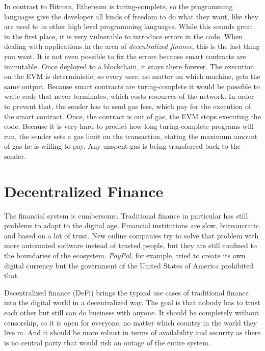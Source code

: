 In contrast to Bitcoin, Ethereum is turing-complete, so the programming languages
give the developer all kinds of freedom to do what they want, like they are used to in other high level programming languages. While this sounds great in the first
place, it is very vulnerable to introduce errors in the code. When dealing with applications in the area of \textit{decentralized finance}, this is the last thing you want.
It is not even possible to fix the errors because smart contracts are immutable. Once deployed to a blockchain, it stays there forever. The execution on the EVM
is deterministic, so every user, no matter on which machine, gets the same output. Because smart contracts are turing-complete it would be possible to write code
that never terminates, which costs resources of the network. In order to prevent that, the sender has to send gas fees, which pay for the execution of the smart
contract. Once, the contract is out of gas, the EVM stops executing the code. Because it is very hard to predict how long turing-complete programs will run, the sender
sets a gas limit on the transaction, stating the maximum amount of gas he is willing to pay. Any unspent gas is being transferred back to the sender.

\section{Decentralized Finance}
The financial system is cumbersome. Traditional finance in particular has still problems to adapt to the digital age. Financial institutions are slow, bureaucratic
and based on a lot of trust. New online companies try to solve that problem with more automated software instead of trusted people, but they are still confined
to the boundaries of the ecosystem. \textit{PayPal}, for example, tried to create its own digital currency but the government of the United States of America prohibited that.

Decentralized finance (DeFi) brings the typical use cases of traditional finance into the digital world in a decentralized way. The goal is that nobody has to trust each
other but still can do business with anyone. It should be completely without censorship, so it is open for everyone, no matter which country in the world they live
in. And it should be more robust in terms of availability and security as there is no central party that would risk an outage of the entire system.

